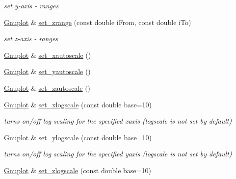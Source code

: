 \begin{DoxyCompactItemize}
\begin{DoxyCompactList}\small\item\em set y-\/axis -\/ ranges \end{DoxyCompactList}\item 
\hypertarget{classkukadu_1_1Gnuplot_a719ea05d40c1cdd23f6844a494064720}{\hyperlink{classkukadu_1_1Gnuplot}{Gnuplot} \& \hyperlink{classkukadu_1_1Gnuplot_a719ea05d40c1cdd23f6844a494064720}{set\-\_\-zrange} (const double i\-From, const double i\-To)}\label{classkukadu_1_1Gnuplot_a719ea05d40c1cdd23f6844a494064720}

\begin{DoxyCompactList}\small\item\em set z-\/axis -\/ ranges \end{DoxyCompactList}\item 
\hyperlink{classkukadu_1_1Gnuplot}{Gnuplot} \& \hyperlink{classkukadu_1_1Gnuplot_ad895bac1da923236a2bbbddf13df4f5b}{set\-\_\-xautoscale} ()
\item 
\hyperlink{classkukadu_1_1Gnuplot}{Gnuplot} \& \hyperlink{classkukadu_1_1Gnuplot_aa5c079210584a06fa50ae99f5fe2d00d}{set\-\_\-yautoscale} ()
\item 
\hyperlink{classkukadu_1_1Gnuplot}{Gnuplot} \& \hyperlink{classkukadu_1_1Gnuplot_a24266265b9d32e8991d1ac053dbc58c5}{set\-\_\-zautoscale} ()
\item 
\hypertarget{classkukadu_1_1Gnuplot_a11893bdae68ab25f8ecb95818ca65395}{\hyperlink{classkukadu_1_1Gnuplot}{Gnuplot} \& \hyperlink{classkukadu_1_1Gnuplot_a11893bdae68ab25f8ecb95818ca65395}{set\-\_\-xlogscale} (const double base=10)}\label{classkukadu_1_1Gnuplot_a11893bdae68ab25f8ecb95818ca65395}

\begin{DoxyCompactList}\small\item\em turns on/off log scaling for the specified xaxis (logscale is not set by default) \end{DoxyCompactList}\item 
\hypertarget{classkukadu_1_1Gnuplot_a83bdceeb4e068075caf98b030ef9372f}{\hyperlink{classkukadu_1_1Gnuplot}{Gnuplot} \& \hyperlink{classkukadu_1_1Gnuplot_a83bdceeb4e068075caf98b030ef9372f}{set\-\_\-ylogscale} (const double base=10)}\label{classkukadu_1_1Gnuplot_a83bdceeb4e068075caf98b030ef9372f}

\begin{DoxyCompactList}\small\item\em turns on/off log scaling for the specified yaxis (logscale is not set by default) \end{DoxyCompactList}\item 
\hypertarget{classkukadu_1_1Gnuplot_aaeecd89ae7aabf9fb304f60965198588}{\hyperlink{classkukadu_1_1Gnuplot}{Gnuplot} \& \hyperlink{classkukadu_1_1Gnuplot_aaeecd89ae7aabf9fb304f60965198588}{set\-\_\-zlogscale} (const double base=10)}\label{classkukadu_1_1Gnuplot_aaeecd89ae7aabf9fb304f60965198588}


\end{DoxyCompactItemize}
